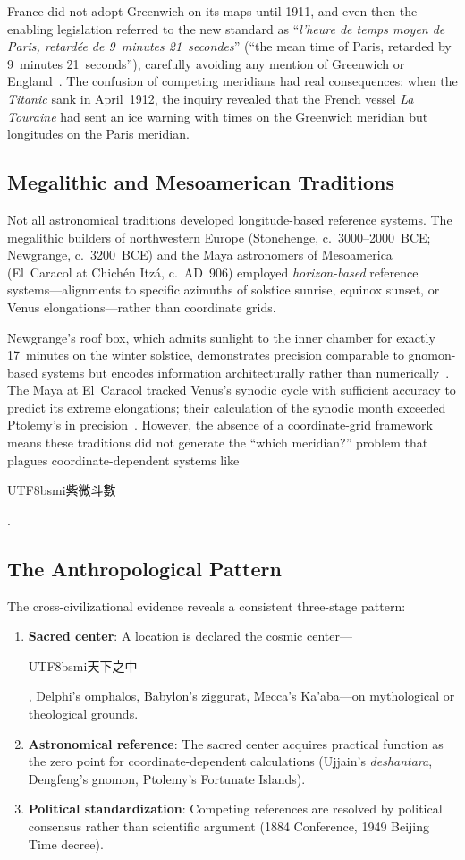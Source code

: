 \documentclass[10pt,a4paper]{article}
\newcommand{\zh}[1]{\begin{CJK}{UTF8}{bsmi}#1\end{CJK}}
\begin{document}
France did not adopt Greenwich on its maps until 1911, and even then the
enabling legislation referred to the new standard as ``\textit{l'heure de
temps moyen de Paris, retard\'{e}e de 9~minutes 21~secondes}'' (``the mean
time of Paris, retarded by 9~minutes 21~seconds''), carefully avoiding any
mention of Greenwich or England~\cite{howse1997}. The confusion of competing
meridians had real consequences: when the \textit{Titanic} sank in April~1912,
the inquiry revealed that the French vessel \textit{La Touraine} had sent an
ice warning with times on the Greenwich meridian but longitudes on the Paris
meridian.

\subsection{Megalithic and Mesoamerican Traditions}
\label{subsec:megalithic}

Not all astronomical traditions developed longitude-based reference systems.
The megalithic builders of northwestern Europe (Stonehenge, c.~3000--2000~BCE;
Newgrange, c.~3200~BCE) and the Maya astronomers of Mesoamerica (El~Caracol
at Chich\'{e}n Itz\'{a}, c.~AD~906) employed \emph{horizon-based} reference
systems---alignments to specific azimuths of solstice sunrise, equinox sunset,
or Venus elongations---rather than coordinate grids.

Newgrange's roof box, which admits sunlight to the inner chamber for exactly
17~minutes on the winter solstice, demonstrates precision comparable to
gnomon-based systems but encodes information architecturally rather than
numerically~\cite{patrick1974}. The Maya at El~Caracol tracked Venus's
synodic cycle with sufficient accuracy to predict its extreme elongations;
their calculation of the synodic month exceeded Ptolemy's in
precision~\cite{aveni2001}. However, the absence of a coordinate-grid
framework means these traditions did not generate the ``which meridian?''
problem that plagues coordinate-dependent systems like \zh{紫微斗數}.

\subsection{The Anthropological Pattern}
\label{subsec:pattern}

The cross-civilizational evidence reveals a consistent three-stage pattern:

\begin{enumerate}
  \item \textbf{Sacred center}: A location is declared the cosmic
    center---\zh{天下之中}, Delphi's omphalos, Babylon's ziggurat,
    Mecca's Ka'aba---on mythological or theological grounds.
  \item \textbf{Astronomical reference}: The sacred center acquires
    practical function as the zero point for coordinate-dependent
    calculations (Ujjain's \textit{deshantara}, Dengfeng's gnomon,
    Ptolemy's Fortunate Islands).
  \item \textbf{Political standardization}: Competing references are
    resolved by political consensus rather than scientific argument
    (1884 Conference, 1949 Beijing Time decree).
\end{enumerate}
\end{document}

